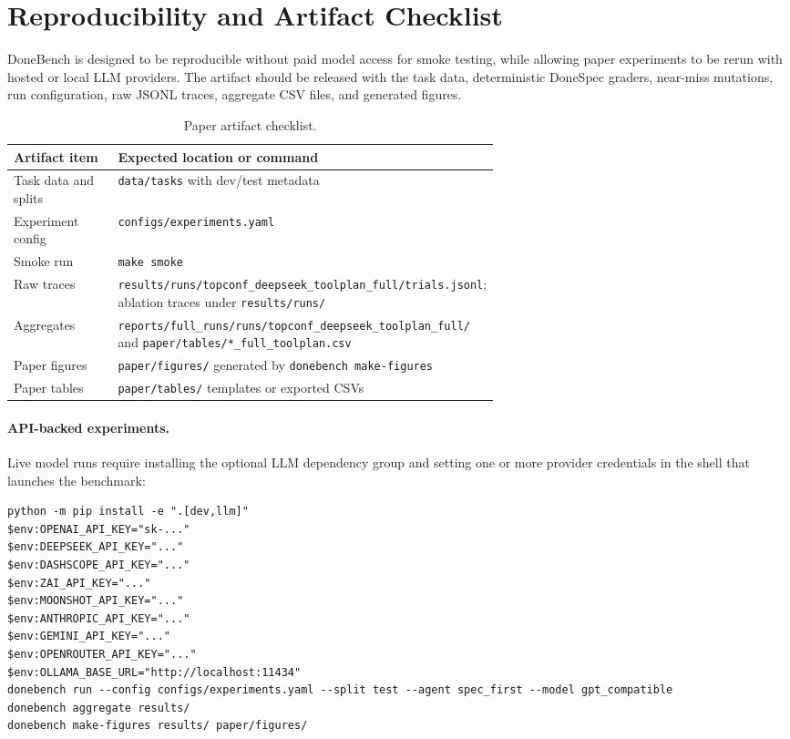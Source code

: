 \section{Reproducibility and Artifact Checklist}

DoneBench is designed to be reproducible without paid model access for smoke testing, while allowing paper experiments to be rerun with hosted or local LLM providers. The artifact should be released with the task data, deterministic DoneSpec graders, near-miss mutations, run configuration, raw JSONL traces, aggregate CSV files, and generated figures.

\begin{table}[tbp]
\centering
\begin{tabular}{lp{0.62\linewidth}}
\toprule
Artifact item & Expected location or command \\
\midrule
Task data and splits & \texttt{data/tasks} with dev/test metadata \\
Experiment config & \texttt{configs/experiments.yaml} \\
Smoke run & \texttt{make smoke} \\
Raw traces & \texttt{results/runs/topconf\_deepseek\_toolplan\_full/trials.jsonl}; ablation traces under \texttt{results/runs/} \\
Aggregates & \texttt{reports/full\_runs/runs/topconf\_deepseek\_toolplan\_full/} and \texttt{paper/tables/*\_full\_toolplan.csv} \\
Paper figures & \texttt{paper/figures/} generated by \texttt{donebench make-figures} \\
Paper tables & \texttt{paper/tables/} templates or exported CSVs \\
\bottomrule
\end{tabular}
\caption{Paper artifact checklist.}
\end{table}

\paragraph{API-backed experiments.}
Live model runs require installing the optional LLM dependency group and setting one or more provider credentials in the shell that launches the benchmark:

\begin{verbatim}
python -m pip install -e ".[dev,llm]"
$env:OPENAI_API_KEY="sk-..."
$env:DEEPSEEK_API_KEY="..."
$env:DASHSCOPE_API_KEY="..."
$env:ZAI_API_KEY="..."
$env:MOONSHOT_API_KEY="..."
$env:ANTHROPIC_API_KEY="..."
$env:GEMINI_API_KEY="..."
$env:OPENROUTER_API_KEY="..."
$env:OLLAMA_BASE_URL="http://localhost:11434"
donebench run --config configs/experiments.yaml --split test --agent spec_first --model gpt_compatible
donebench aggregate results/
donebench make-figures results/ paper/figures/
\end{verbatim}

